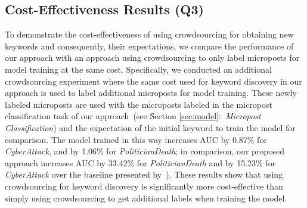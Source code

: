 \documentclass[letterpaper]{article}
\begin{document}
\subsection{Cost-Effectiveness Results (Q3)}
To demonstrate the cost-effectiveness of using crowdsourcing for obtaining new keywords and consequently, their expectations, we compare the performance of our approach with an approach using crowdsourcing to only label microposts for model training at the same cost.
Specifically, we conducted an additional crowdsourcing experiment where the same cost used for keyword discovery in our approach is used to label additional microposts for model training.
These newly labeled microposts are used with the microposts labeled in the micropost classification task of our approach~(see Section \ref{sec:model}:~\emph{Micropost Classification}) and the expectation of the initial keyword to train the model for comparison. %
The model trained in this way increases AUC by 0.87\% for \emph{CyberAttack}, and by 1.06\% for \emph{PoliticianDeath}; in comparison, our proposed approach increases AUC by 33.42\% for \emph{PoliticianDeath} and by 15.23\% for \emph{CyberAttack} over the baseline presented by~\citeauthor{ritter2015weakly}).
These results show that using crowdsourcing for keyword discovery is significantly more cost-effective than simply using crowdsourcing to get additional labels when training the model.

\end{document}
